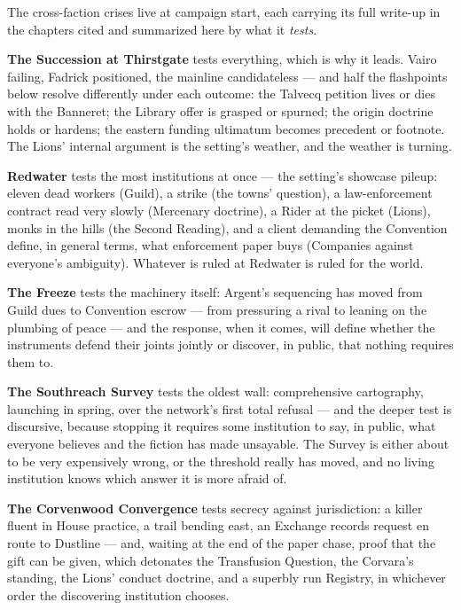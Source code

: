 The cross-faction crises live at campaign start, each carrying its full write-up in the chapters cited and summarized here by what it \textit{tests}.

\textbf{The Succession at Thirstgate} tests everything, which is why it leads. Vairo failing, Fadrick positioned, the mainline candidateless --- and half the flashpoints below resolve differently under each outcome: the Talvecq petition lives or dies with the Banneret; the Library offer is grasped or spurned; the origin doctrine holds or hardens; the eastern funding ultimatum becomes precedent or footnote. The Lions' internal argument is the setting's weather, and the weather is turning.

\textbf{Redwater} tests the most institutions at once --- the setting's showcase pileup: eleven dead workers (Guild), a strike (the towns' question), a law-enforcement contract read very slowly (Mercenary doctrine), a Rider at the picket (Lions), monks in the hills (the Second Reading), and a client demanding the Convention define, in general terms, what enforcement paper buys (Companies against everyone's ambiguity). Whatever is ruled at Redwater is ruled for the world.

\textbf{The Freeze} tests the machinery itself: Argent's sequencing has moved from Guild dues to Convention escrow --- from pressuring a rival to leaning on the plumbing of peace --- and the response, when it comes, will define whether the instruments defend their joints jointly or discover, in public, that nothing requires them to.

\textbf{The Southreach Survey} tests the oldest wall: comprehensive cartography, launching in spring, over the network's first total refusal --- and the deeper test is discursive, because stopping it requires some institution to say, in public, what everyone believes and the fiction has made unsayable. The Survey is either about to be very expensively wrong, or the threshold really has moved, and no living institution knows which answer it is more afraid of.

\textbf{The Corvenwood Convergence} tests secrecy against jurisdiction: a killer fluent in House practice, a trail bending east, an Exchange records request en route to Dustline --- and, waiting at the end of the paper chase, proof that the gift can be given, which detonates the Transfusion Question, the Corvara's standing, the Lions' conduct doctrine, and a superbly run Registry, in whichever order the discovering institution chooses.

